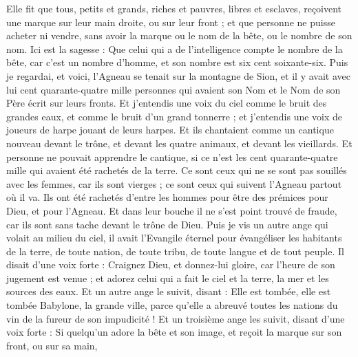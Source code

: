 \begin{multicols}{2}
Elle fit que tous, petits et grands, riches et pauvres, libres et esclaves, reçoivent une marque sur leur main droite, ou sur leur front ;
et que personne ne puisse acheter ni vendre, sans avoir la marque ou le nom de la bête, ou le nombre de son nom.
Ici est la sagesse : Que celui qui a de l'intelligence compte le nombre de la bête, car c'est un nombre d'homme, et son nombre est six cent soixante-six.
\VerseOne{}Puis je regardai, et voici, l'Agneau se tenait sur la montagne de Sion, et il y avait avec lui cent quarante-quatre mille personnes qui avaient son Nom et le Nom de son Père écrit sur leurs fronts.
Et j'entendis une voix du ciel comme le bruit des grandes eaux, et comme le bruit d'un grand tonnerre ; et j'entendis une voix de joueurs de harpe jouant de leurs harpes.
Et ils chantaient comme un cantique nouveau devant le trône, et devant les quatre animaux, et devant les vieillards. Et personne ne pouvait apprendre le cantique, si ce n'est les cent quarante-quatre mille qui avaient été rachetés de la terre.
Ce sont ceux qui ne se sont pas souillés avec les femmes, car ils sont vierges ; ce sont ceux qui suivent l'Agneau partout où il va. Ils ont été rachetés d'entre les hommes pour être des prémices pour Dieu, et pour l'Agneau.
Et dans leur bouche il ne s'est point trouvé de fraude, car ils sont sans tache devant le trône de Dieu.
Puis je vis un autre ange qui volait au milieu du ciel, il avait l'Evangile éternel pour évangéliser les habitants de la terre, de toute nation, de toute tribu, de toute langue et de tout peuple.
Il disait d'une voix forte : Craignez Dieu, et donnez-lui gloire, car l'heure de son jugement est venue ; et adorez celui qui a fait le ciel et la terre, la mer et les sources des eaux.
Et un autre ange le suivit, disant : Elle est tombée, elle est tombée Babylone, la grande ville, parce qu'elle a abreuvé toutes les nations du vin de la fureur de son impudicité !
Et un troisième ange les suivit, disant d'une voix forte : Si quelqu'un adore la bête et son image, et reçoit la marque sur son front, ou sur sa main,

\end{multicols}
